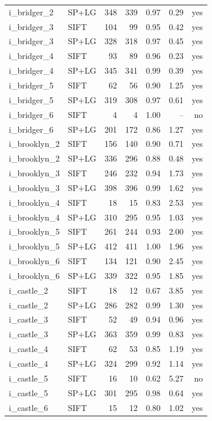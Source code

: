 \begin{longtable}{llrrrrr}
i\_bridger\_2 & SP+LG & 348 & 339 & 0.97 & 0.29 & yes \\
i\_bridger\_3 & SIFT & 104 & 99 & 0.95 & 0.42 & yes \\
i\_bridger\_3 & SP+LG & 328 & 318 & 0.97 & 0.45 & yes \\
i\_bridger\_4 & SIFT & 93 & 89 & 0.96 & 0.23 & yes \\
i\_bridger\_4 & SP+LG & 345 & 341 & 0.99 & 0.39 & yes \\
i\_bridger\_5 & SIFT & 62 & 56 & 0.90 & 1.25 & yes \\
i\_bridger\_5 & SP+LG & 319 & 308 & 0.97 & 0.61 & yes \\
i\_bridger\_6 & SIFT & 4 & 4 & 1.00 & -- & no \\
i\_bridger\_6 & SP+LG & 201 & 172 & 0.86 & 1.27 & yes \\
i\_brooklyn\_2 & SIFT & 156 & 140 & 0.90 & 0.71 & yes \\
i\_brooklyn\_2 & SP+LG & 336 & 296 & 0.88 & 0.48 & yes \\
i\_brooklyn\_3 & SIFT & 246 & 232 & 0.94 & 1.73 & yes \\
i\_brooklyn\_3 & SP+LG & 398 & 396 & 0.99 & 1.62 & yes \\
i\_brooklyn\_4 & SIFT & 18 & 15 & 0.83 & 2.53 & yes \\
i\_brooklyn\_4 & SP+LG & 310 & 295 & 0.95 & 1.03 & yes \\
i\_brooklyn\_5 & SIFT & 261 & 244 & 0.93 & 2.00 & yes \\
i\_brooklyn\_5 & SP+LG & 412 & 411 & 1.00 & 1.96 & yes \\
i\_brooklyn\_6 & SIFT & 134 & 121 & 0.90 & 2.45 & yes \\
i\_brooklyn\_6 & SP+LG & 339 & 322 & 0.95 & 1.85 & yes \\
i\_castle\_2 & SIFT & 18 & 12 & 0.67 & 3.85 & yes \\
i\_castle\_2 & SP+LG & 286 & 282 & 0.99 & 1.30 & yes \\
i\_castle\_3 & SIFT & 52 & 49 & 0.94 & 0.96 & yes \\
i\_castle\_3 & SP+LG & 363 & 359 & 0.99 & 0.83 & yes \\
i\_castle\_4 & SIFT & 62 & 53 & 0.85 & 1.19 & yes \\
i\_castle\_4 & SP+LG & 324 & 299 & 0.92 & 1.14 & yes \\
i\_castle\_5 & SIFT & 16 & 10 & 0.62 & 5.27 & no \\
i\_castle\_5 & SP+LG & 301 & 295 & 0.98 & 0.64 & yes \\
i\_castle\_6 & SIFT & 15 & 12 & 0.80 & 1.02 & yes \\

\end{longtable}
